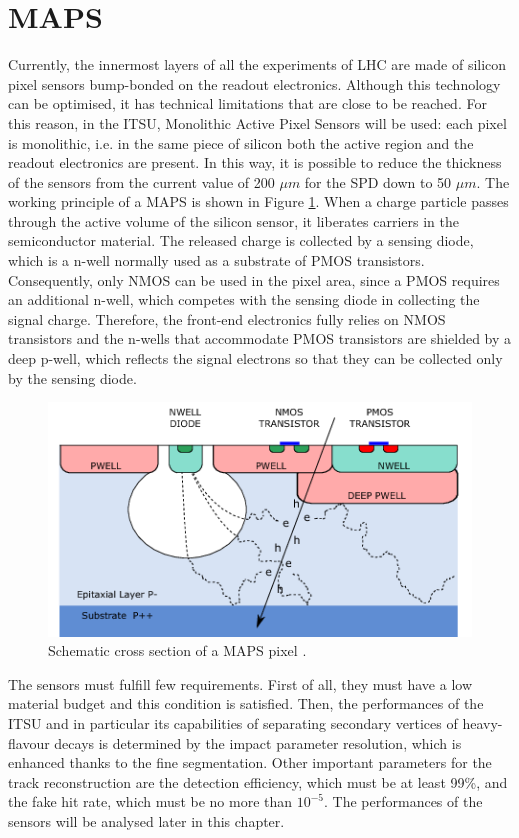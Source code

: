 \section{MAPS}
\label{sec:maps}
Currently, the innermost layers of all the experiments of LHC are made of silicon pixel sensors bump-bonded on the readout electronics. Although this technology can be optimised, it has technical limitations that are close to be reached. For this reason, in the ITSU, Monolithic Active Pixel Sensors will be used: each pixel is monolithic, i.e. in the same piece of silicon both the active region and the readout electronics are present. In this way, it is possible to reduce the thickness of the sensors from the current value of 200 $\mu m$ for the SPD down to 50 $\mu m$. The working principle of a MAPS is shown in Figure \ref{fig:maps}. When a charge particle passes through the active volume of the silicon sensor, it liberates carriers in the semiconductor material. The released charge is collected by a sensing diode, which is a n-well normally used as a substrate of PMOS transistors. Consequently, only NMOS can be used in the pixel area, since a PMOS requires an additional n-well, which competes with the sensing diode in collecting the signal charge. Therefore, the front-end electronics fully relies on NMOS transistors and the n-wells that accommodate PMOS transistors are shielded by a deep p-well, which reflects the signal electrons so that they can be collected only by the sensing diode.
%
\begin{figure}
  \centering
  \includegraphics[scale=0.7]{figures/maps.png}
  \caption{Schematic cross section of a MAPS pixel \cite{uptdr}.}
  \label{fig:maps}
\end{figure}
%
The sensors must fulfill few requirements. First of all, they must have a low material budget and this condition is satisfied. Then, the performances of the ITSU and in particular its capabilities of separating secondary vertices of heavy-flavour decays is determined by the impact parameter resolution, which is enhanced thanks to the fine segmentation. Other important parameters for the track reconstruction are the detection efficiency, which must be at least 99\%, and the fake hit rate, which must be no more than $10^{-5}$. The performances of the sensors will be analysed later in this chapter.\\
